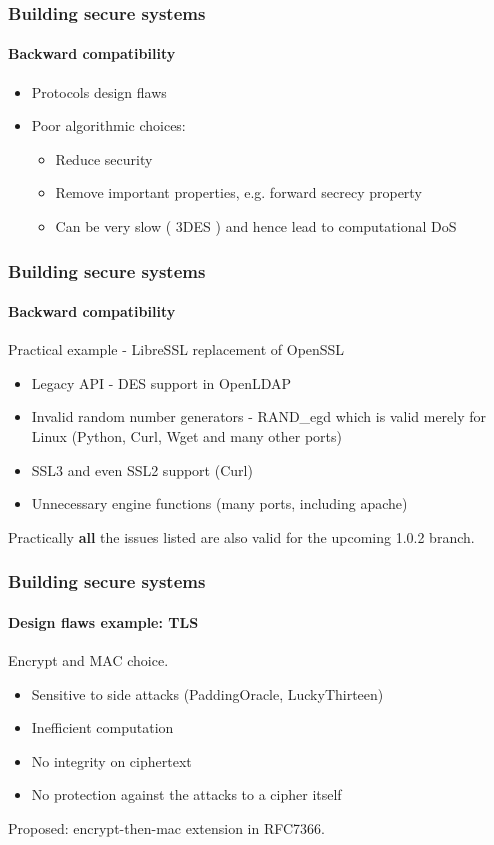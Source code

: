 \documentclass[12pt,t]{beamer}
\newcommand{\funcname}[1]{
	{\color{yellow!30} #1}
}
\newcommand{\cipher}[1]{
	{\color{blue!30} #1}
}
\begin{document}
\begin{frame}
\frametitle{Building secure systems}
\framesubtitle{Backward compatibility}
\begin{itemize}
\item<1-> Protocols design flaws
\item<2-> Poor algorithmic choices:
	\begin{itemize}
	\item Reduce security
	\item Remove important properties, e.g. forward secrecy property
	\item Can be very slow (\cipher{3DES}) and hence lead to computational DoS
	\end{itemize}
\end{itemize}
\end{frame}

\begin{frame}
\frametitle{Building secure systems}
\framesubtitle{Backward compatibility}
Practical example - LibreSSL replacement of OpenSSL
\begin{itemize}
\item Legacy API - \cipher{DES} support in OpenLDAP
\item Invalid random number generators - \funcname{RAND\_egd} which is valid merely for Linux (Python, Curl, Wget and many other ports)
\item SSL3 and even SSL2 support (Curl)
\item Unnecessary engine functions (many ports, including apache) 
\end{itemize}

Practically \textbf{all} the issues listed are also valid for the upcoming 1.0.2 branch.
\end{frame}

\begin{frame}
\frametitle{Building secure systems}
\framesubtitle{Design flaws example: TLS}
Encrypt and MAC choice.
\begin{itemize}
\item Sensitive to side attacks (PaddingOracle, LuckyThirteen)
\item Inefficient computation
\item No integrity on ciphertext
\item No protection against the attacks to a cipher itself
\end{itemize}
Proposed: encrypt-then-mac extension in RFC7366.
\end{frame}
\end{document}

